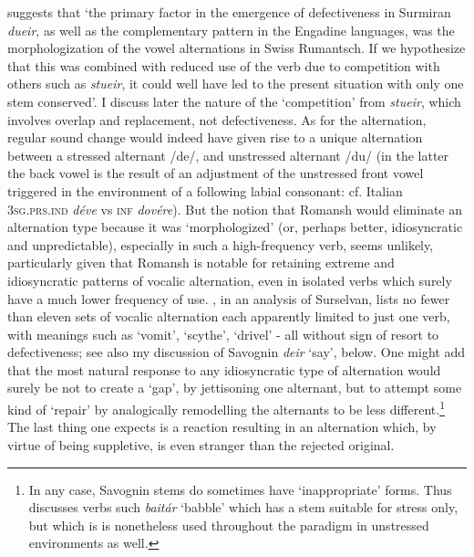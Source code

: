 \documentclass[output=paper,
modfonts
]{LSP/langsci}
\begin{document}
\citet[32]{anderson2010a} suggests that `the primary factor in the emergence of
defectiveness in Surmiran \emph{dueir}, as well as the complementary
pattern in the Engadine languages, was the morphologization of the vowel
alternations in Swiss Rumantsch. If we hypothesize that this was
combined with reduced use of the verb due to competition with others
such as \emph{stueir}, it could well have led to the present situation with
only one stem conserved'. I discuss later the nature of the
`competition' from \emph{stueir}, which involves overlap and
replacement, not defectiveness. As for the alternation, regular sound
change would indeed have given rise to a unique alternation between a
stressed alternant /de/, and unstressed alternant /du/ (in the latter
the back vowel is the result of an adjustment of the unstressed front
vowel triggered in the environment of a following labial consonant: cf.
Italian \textsc{3sg.prs.ind} \emph{déve} vs \textsc{inf} \emph{dovére}).
But the notion that Romansh would eliminate an alternation type because
it was `morphologized' (or, perhaps better, idiosyncratic and
unpredictable), especially in such a high-frequency verb, seems
unlikely, particularly given that Romansh is notable for retaining
extreme and idiosyncratic patterns of vocalic alternation, even in
isolated verbs which surely have a much lower frequency of use. \citet{rogers1972a}, in an analysis of Surselvan, lists no fewer than eleven sets of
vocalic alternation each apparently limited to just one verb, with
meanings such as `vomit', `scythe', `drivel' - all without sign of
resort to defectiveness; see also my discussion of Savognin \emph{deir}
`say', below. One might add that the most natural response to any
idiosyncratic type of alternation would surely be not to create a `gap',
by jettisoning one alternant, but to attempt some kind of `repair' by
analogically remodelling the alternants to be less different.\footnote{In
  any case, Savognin stems do sometimes have `inappropriate' forms. Thus
  \citet[32]{anderson2011a} discusses verbs such \emph{baitár} `babble' which
  has a stem suitable for stress only, but which is is nonetheless used
  throughout the paradigm in unstressed environments as well.} The last
thing one expects is a reaction resulting in an alternation which, by
virtue of being suppletive, is even stranger than the rejected original.
\end{document}
